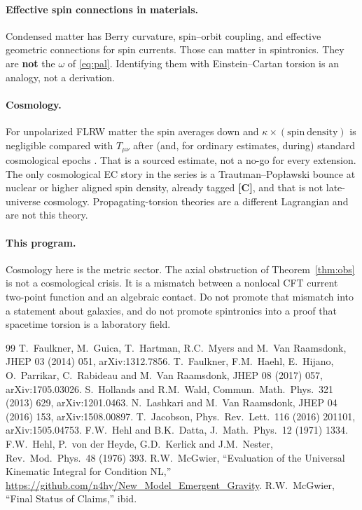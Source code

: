 \documentclass[11pt]{article}
\theoremstyle{definition}
\newcommand{\pC}{\textbf{[C]}}
\begin{document}
\paragraph{Effective spin connections in materials.}
Condensed matter has Berry curvature, spin--orbit coupling, and
effective geometric connections for spin currents. Those can matter
in spintronics. They are \textbf{not} the $\omega$ of
\eqref{eq:pal}. Identifying them with Einstein--Cartan torsion is
an analogy, not a derivation.

\paragraph{Cosmology.}
For unpolarized FLRW matter the spin averages down and
$\kappa\times(\mathrm{spin\ density})$ is negligible compared with
$T_{\mu\nu}$ after (and, for ordinary estimates, during) standard
cosmological epochs \cite{Hehl1976}. That is a sourced estimate,
not a no-go for every extension. The only cosmological EC story in
the series is a Trautman--Pop\l awski bounce at nuclear or higher
aligned spin density, already tagged \pC{}, and that is not
late-universe cosmology. Propagating-torsion theories are a
different Lagrangian and are not this theory.

\paragraph{This program.}
Cosmology here is the metric sector. The axial obstruction of
Theorem~\ref{thm:obs} is not a cosmological crisis. It is a
mismatch between a nonlocal CFT current two-point function and an
algebraic contact. Do not promote that mismatch into a statement
about galaxies, and do not promote spintronics into a proof that
spacetime torsion is a laboratory field.

\begin{thebibliography}{99}
T.~Faulkner, M.~Guica, T.~Hartman, R.C.~Myers and M.~Van Raamsdonk,
JHEP 03 (2014) 051, arXiv:1312.7856.
T.~Faulkner, F.M.~Haehl, E.~Hijano, O.~Parrikar, C.~Rabideau and M.~Van Raamsdonk,
JHEP 08 (2017) 057, arXiv:1705.03026.
S.~Hollands and R.M.~Wald,
Commun.\ Math.\ Phys.\ 321 (2013) 629, arXiv:1201.0463.
N.~Lashkari and M.~Van Raamsdonk,
JHEP 04 (2016) 153, arXiv:1508.00897.
T.~Jacobson,
Phys.\ Rev.\ Lett.\ 116 (2016) 201101, arXiv:1505.04753.
F.W.~Hehl and B.K.~Datta,
J.\ Math.\ Phys.\ 12 (1971) 1334.
F.W.~Hehl, P.~von der Heyde, G.D.~Kerlick and J.M.~Nester,
Rev.\ Mod.\ Phys.\ 48 (1976) 393.
R.W.~McGwier,
``Evaluation of the Universal Kinematic Integral for Condition NL,''
\url{https://github.com/n4hy/New_Model_Emergent_Gravity}.
R.W.~McGwier,
``Final Status of Claims,'' ibid.
\end{thebibliography}
\end{document}
